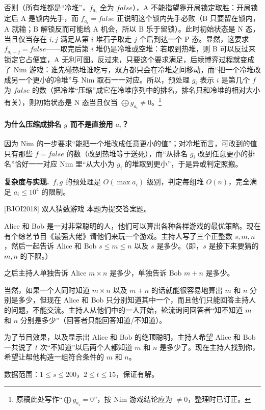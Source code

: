 \documentclass[UTF8,a4paper,11pt,oneside,openany,fontset=fandol]{ctexbook}
\theoremstyle{definition}
\newcommand{\cost}{\par\noindent\textbf{复杂度与实现.}\ }
\begin{document}
否则（所有堆都是“冷堆”，$f_{a_i}$ 全为 $false$），A 不能指望靠开局锁定取胜：开局锁定后 A 是锁内先手，而 $f_{a_i}=false$ 正说明这个锁内先手必败（B 只要留在锁内，A 就输；B 解锁反而可能给 A 机会，所以 B 乐于留锁）。此时初始状态是 N 态，当且仅当存在 $i,j$ 满足从第 $i$ 堆石子取走 $j$ 个后到达一个 P 态。显然，这要求 $f_{a_i-j}=false$——取完后第 $i$ 堆仍是冷堆或空堆：若取到热堆，则 B 可以反过来锁定它占便宜，A 无利可图。反过来，只要这个要求满足，后续博弈过程就变成了 Nim 游戏：谁先碰热堆谁吃亏，双方都只会在冷堆之间移动，而“把一个冷堆改成另一个更小的冷堆”与 Nim 取石一一对应。所以，预处理 $g_i$ 表示 $i$ 是第几个 $f$ 为 $false$ 的数（把冷堆“压缩”成它在冷堆序列中的排名，排名只和冷堆的相对大小有关），则初始状态是 N 态当且仅当 $\bigoplus g_{a_i}\ne0$。\footnote{原稿此处写作“$\bigoplus g_{a_i}=0$”，按 Nim 游戏结论应为 $\ne0$，整理时已订正。}

\paragraph{为什么压缩成排名 $g$ 而不是直接用 $a_i$？} 因为 Nim 的一步要求“能把一个堆改成任意更小的值”；对冷堆而言，可改到的值只有那些 $f=false$ 的数（改到热堆等于送死），而“从排名 $g_i$ 改到任意更小的排名”恰好一一对应 Nim 里“从大小为 $g_i$ 的堆取到更小”，于是异或判定照搬。

\cost $f,g$ 的预处理是 $O(\max a_i)$ 级别，判定每组堆 $O(n)$，完全满足 $a_i\le10^{4}$ 的限制。

\begin{problem}{[BJOI2018] 双人猜数游戏}
本题为提交答案题。

Alice 和 Bob 是一对非常聪明的人，他们可以算出各种各样游戏的最优策略。现在有个综艺节目《最强大佬》请他们来玩一个游戏。主持人写了三个正整数 $s,m,n$，然后一起告诉 Alice 和 Bob $s\le m\le n$ 以及 $s$ 是多少。（即，$s$ 是接下来要猜的 $m,n$ 的下限。）

之后主持人单独告诉 Alice $m\times n$ 是多少，单独告诉 Bob $m+n$ 是多少。

当然，如果一个人同时知道 $m\times n$ 以及 $m+n$ 的话就能很容易地算出 $m$ 和 $n$ 分别是多少，但现在 Alice 和 Bob 只分别知道其中一个，而且他们只能回答主持人的问题，不能交流。主持人从他们中的一人开始，轮流询问回答者“知不知道 $m$ 和 $n$ 分别是多少”（回答者只能回答知道/不知道）。

为了节目效果，以及显示出 Alice 和 Bob 的绝顶聪明，主持人希望 Alice 和 Bob 一共说了 $t$ 次“不知道”以后两个人都知道 $m$ 和 $n$ 是多少了。现在主持人找到你，希望让帮他构造一组符合条件的 $m$ 和 $n$。

数据范围：$1\le s\le200$，$2\le t\le15$，保证有解。
\end{problem}
\end{document}
